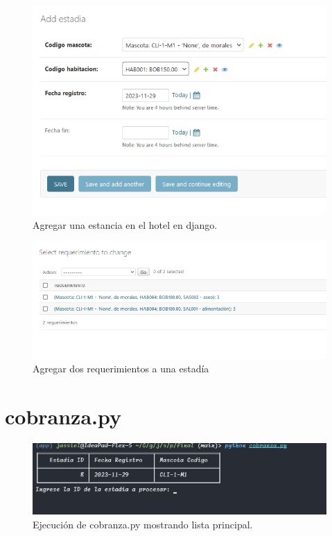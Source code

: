 \documentclass[
  12pt,
  hidelinks,
  a4paper,
  headings=standardclasses,
  headings=big,
  spanish
]{scrartcl}
\begin{document}
\begin{figure}[H]
  \centering
  \includegraphics[width=\textwidth]{django-estancia-add.png}
  \caption{Agregar una estancia en el hotel en django.}
\end{figure}

\begin{figure}[H]
  \centering
  \includegraphics[width=\textwidth]{django-requisitos.add.png}
  \caption{Agregar dos requerimientos a una estadía}
\end{figure}
  
\pagebreak
\section{cobranza.py}

\begin{figure}[H]
  \centering
  \includegraphics[width=\textwidth]{cobranza-lista.png}
  \caption{Ejecución de cobranza.py mostrando lista principal.}
\end{figure}
\end{document}
